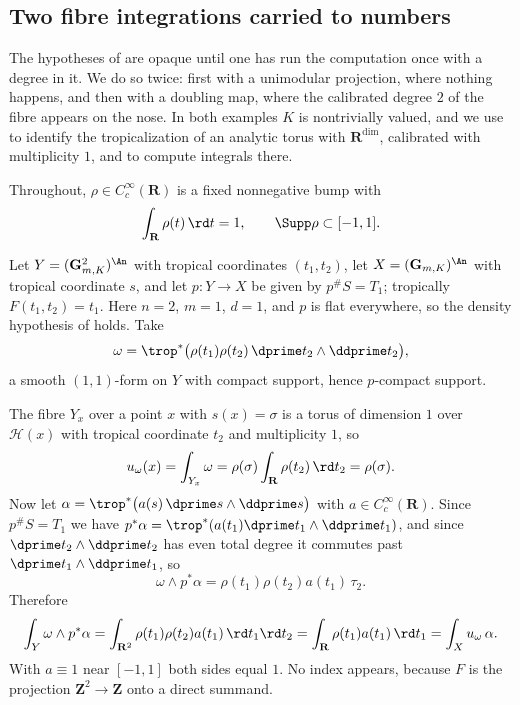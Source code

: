 \subsection{Two fibre integrations carried to numbers}
\label{sec:ch14-fibre-numbers}

The hypotheses of  are opaque until one has
run the computation once with a degree in it.  We do so twice: first with a
unimodular projection, where nothing happens, and then with a doubling map,
where the calibrated degree $2$ of the fibre appears on the nose.  In both
examples $K$ is nontrivially valued, and we use
 to identify the tropicalization of an
analytic torus with $\mathbf R^{\dim}$, calibrated with multiplicity $1$, and
 to compute integrals there.

Throughout, $\rho\in C_c^\infty(\mathbf R)$ is a fixed nonnegative bump with
\[
 \int_{\mathbf R}\rho(t)\,\rd t=1,
 \qquad \Supp\rho\subset[-1,1].
\]

\begin{example}
\label{ex:ch14-fibre-projection-numbers}
Let $Y=(\mathbf G_{m,K}^2)^{\An}$ with tropical coordinates $(t_1,t_2)$, let
$X=(\mathbf G_{m,K})^{\An}$ with tropical coordinate $s$, and let
$p:Y\to X$ be given by $p^\#S=T_1$; tropically $F(t_1,t_2)=t_1$.  Here
$n=2$, $m=1$, $d=1$, and $p$ is flat everywhere, so the density hypothesis of
 holds.  Take
\[
 \omega=\trop^*\bigl(\rho(t_1)\rho(t_2)\,\dprime t_2\wedge\ddprime t_2\bigr),
\]
a smooth $(1,1)$-form on $Y$ with compact support, hence $p$-compact support.

The fibre $Y_x$ over a point $x$ with $s(x)=\sigma$ is a torus of dimension
$1$ over $\mathcal H(x)$ with tropical coordinate $t_2$ and multiplicity $1$,
so
\[
 u_\omega(x)=\int_{Y_x}\omega
 =\rho(\sigma)\int_{\mathbf R}\rho(t_2)\,\rd t_2
 =\rho(\sigma).
\]
Now let $\alpha=\trop^*\bigl(a(s)\,\dprime s\wedge\ddprime s\bigr)$ with
$a\in C_c^\infty(\mathbf R)$.  Since $p^\#S=T_1$ we have
$p^*\alpha=\trop^*(a(t_1)\dprime t_1\wedge\ddprime t_1)$, and since
$\dprime t_2\wedge\ddprime t_2$ has even total degree it commutes past
$\dprime t_1\wedge\ddprime t_1$, so
\[
 \omega\wedge p^*\alpha
 =\rho(t_1)\rho(t_2)a(t_1)\,\tau_2 .
\]
Therefore
\[
 \int_Y\omega\wedge p^*\alpha
 =\int_{\mathbf R^2}\rho(t_1)\rho(t_2)a(t_1)\,\rd t_1\rd t_2
 =\int_{\mathbf R}\rho(t_1)a(t_1)\,\rd t_1
 =\int_Xu_\omega\,\alpha .
\]
With $a\equiv1$ near $[-1,1]$ both sides equal $1$.  No index appears, because
$F$ is the projection $\mathbf Z^2\to\mathbf Z$ onto a direct summand.
\end{example}

